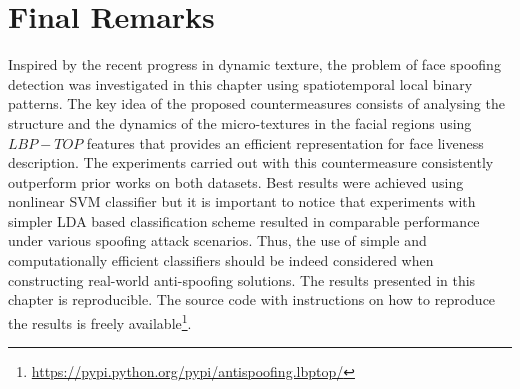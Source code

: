 
\section{Final Remarks}
\label{sec:Proposed_finalremarks}

Inspired by the recent progress in dynamic texture, the problem of face spoofing detection was investigated in this chapter using spatiotemporal local binary patterns. The key idea of the proposed countermeasures consists of analysing the structure and the dynamics of the micro-textures in the facial regions using $LBP-TOP$ features that provides an efficient representation for face liveness description. The experiments carried out with this countermeasure consistently outperform prior works on both datasets. Best results were achieved using nonlinear SVM classifier but it is important to notice that experiments with simpler LDA based classification scheme resulted in comparable performance under various spoofing attack scenarios. Thus, the use of simple and computationally efficient classifiers should be indeed considered when constructing real-world anti-spoofing solutions. The results presented in this chapter is reproducible. The source code with instructions on how to reproduce the results is freely available\footnote{\url{https://pypi.python.org/pypi/antispoofing.lbptop/}}.

